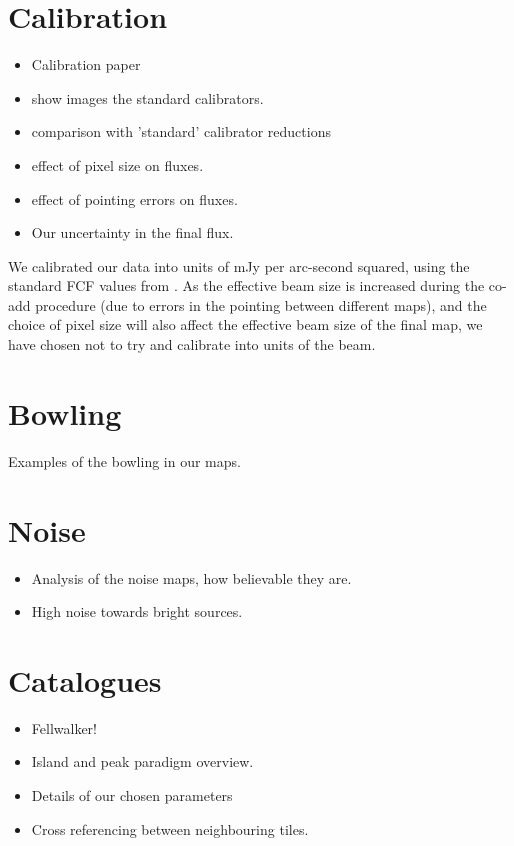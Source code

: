 \documentclass[usenatbib]{mn2e}
\begin{document}
\section{Calibration}
\begin{itemize}
\item Calibration paper \citep{2013MNRAS.430.2534D}
\item show images the standard calibrators.
\item comparison with 'standard' calibrator reductions
\item effect of pixel size on fluxes.
\item effect of pointing errors on fluxes.
\item Our uncertainty in the final flux.
\end{itemize}


We calibrated our data into units of mJy per arc-second squared, using
the standard FCF values from \citet{2013MNRAS.430.2534D}.  As the
effective beam size is increased during the co-add procedure (due to
errors in the pointing between different maps), and the choice of
pixel size will also affect the effective beam size of the final map,
we have chosen not to try and calibrate into units of the beam.


\section{Bowling}
Examples of the bowling in our maps.

\section{Noise}
\begin{itemize}
\item Analysis of the noise maps, how believable they are.
\item High noise towards bright sources.
\end{itemize}



\section{Catalogues}
\begin{itemize}
\item Fellwalker! \citep{2015A&C....10...22B}
\item Island and peak paradigm overview.
\item Details of our chosen parameters
\item Cross referencing between neighbouring tiles.
\end{itemize}
\end{document}
